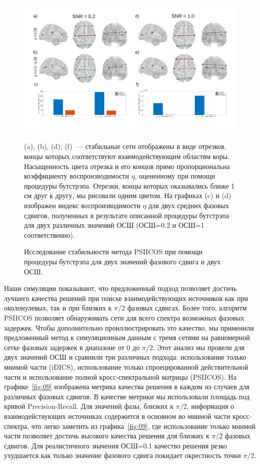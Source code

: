 \begin{figure}[!ht]
 \includegraphics[width=\textwidth]{../images/psiicos_paper/Figure8_hr.jpg}
 \caption{Исследование стабильности метода PSIICOS при помощи процедуры бутстрэпа для
 двух значений фазового сдвига и двух ОСШ.}\label{fig:08}
 (a), (b), (d), (f)~--- стабильные сети отображены в виде отрезков, концы которых
 соответствуют взаимодействующим областям коры. Насыщенность цвета отрезка
 и его концов прямо пропорциональна коэффициенту воспроизводимости $\eta$,
 оцененному при помощи процедуры бутстрэпа. Отрезки, концы которых
 оказывались ближе 1 см друг к другу, мы рисовали одним цветом.
 На графиках (c) и (d) изображен индекс воспроизводимости $\eta$ для
 двух средних фазовых сдвигов, полученных в результате описанной процедуры
 бутстрэпа для двух различных значений ОСШ (ОСШ=0.2 и ОСШ=1 соответственно).
\end{figure}%


Наши симуляции показывают, что предложенный подход позволяет достичь лучшего
качества решений при поиске взаимодействующих источников как при околонулевых,
так и при близких к $\pi/2$ фазовых сдвигах. Более того, алгоритм PSIICOS
позволяет обнаруживать сети для всего спектра возможных фазовых задержек. Чтобы
дополнительно проиллюстрировать это качество, мы применили предложенный метод к
симуляционным данным с тремя сетями на равномерной сетке фазовых задержек в
диапазоне от 0 до $\pi/2$. Этот анализ мы провели для двух значений ОСШ и
сравнили три различных подхода: использование только мнимой части (iDICS),
использование только спроецированной действительной части и использование
полной кросс-спектральной матрицы (PSIICOS). На графике~\ref{fig:09}
изображена метрика качества решения в каждом из случаев для различных фазовых
сдвигов.  В качестве метрики мы использовали площадь под кривой
Precision-Recall. Для значений фазы, близких к $\pi/2$, информация о взаимодействующих
источниках содержится в основном во мнимой части кросс-спектра, что легко
заметить из графика~\ref{fig:09}, где использование только мнимой части позволяет достичь
высокого качества решения для близких к $\pi/2$ фазовых сдвигов. Для реалистичного
значения ОСШ=0.1 качество решения резко ухудшается как только значение фазового сдвига
покидает окрестность точки $\pi/2$.

